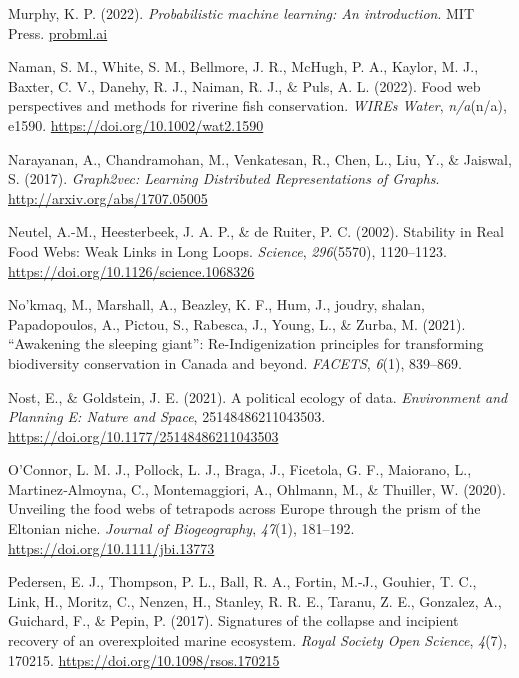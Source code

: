 \documentclass[11pt]{article}
\newlength{\cslhangindent}
\newenvironment{CSLReferences}[2] %
 {%
  \setlength{\parindent}{0pt}
  \ifodd #1 \everypar{\setlength{\hangindent}{\cslhangindent}}\ignorespaces\fi
  \ifnum #2 > 0
  \setlength{\parskip}{#2\baselineskip}
  \fi
 }%
 {}
\begin{document}
\begin{CSLReferences}{1}{0}
\leavevmode{}%
Murphy, K. P. (2022). \emph{Probabilistic machine learning: An
introduction}. MIT Press. \href{https://probml.ai}{probml.ai}

\leavevmode{}%
Naman, S. M., White, S. M., Bellmore, J. R., McHugh, P. A., Kaylor, M.
J., Baxter, C. V., Danehy, R. J., Naiman, R. J., \& Puls, A. L. (2022).
Food web perspectives and methods for riverine fish conservation.
\emph{WIREs Water}, \emph{n/a}(n/a), e1590.
\url{https://doi.org/10.1002/wat2.1590}

\leavevmode{}%
Narayanan, A., Chandramohan, M., Venkatesan, R., Chen, L., Liu, Y., \&
Jaiswal, S. (2017). \emph{Graph2vec: Learning Distributed
Representations of Graphs}. \url{http://arxiv.org/abs/1707.05005}

\leavevmode{}%
Neutel, A.-M., Heesterbeek, J. A. P., \& de Ruiter, P. C. (2002).
Stability in Real Food Webs: Weak Links in Long Loops. \emph{Science},
\emph{296}(5570), 1120--1123.
\url{https://doi.org/10.1126/science.1068326}

\leavevmode{}%
No'kmaq, M., Marshall, A., Beazley, K. F., Hum, J., joudry, shalan,
Papadopoulos, A., Pictou, S., Rabesca, J., Young, L., \& Zurba, M.
(2021). {``Awakening the sleeping giant''}: Re-Indigenization principles
for transforming biodiversity conservation in Canada and beyond.
\emph{FACETS}, \emph{6}(1), 839--869.

\leavevmode{}%
Nost, E., \& Goldstein, J. E. (2021). A political ecology of data.
\emph{Environment and Planning E: Nature and Space}, 25148486211043503.
\url{https://doi.org/10.1177/25148486211043503}

\leavevmode{}%
O'Connor, L. M. J., Pollock, L. J., Braga, J., Ficetola, G. F.,
Maiorano, L., Martinez‐Almoyna, C., Montemaggiori, A., Ohlmann, M., \&
Thuiller, W. (2020). Unveiling the food webs of tetrapods across Europe
through the prism of the Eltonian niche. \emph{Journal of Biogeography},
\emph{47}(1), 181--192. \url{https://doi.org/10.1111/jbi.13773}

\leavevmode{}%
Pedersen, E. J., Thompson, P. L., Ball, R. A., Fortin, M.-J., Gouhier,
T. C., Link, H., Moritz, C., Nenzen, H., Stanley, R. R. E., Taranu, Z.
E., Gonzalez, A., Guichard, F., \& Pepin, P. (2017). Signatures of the
collapse and incipient recovery of an overexploited marine ecosystem.
\emph{Royal Society Open Science}, \emph{4}(7), 170215.
\url{https://doi.org/10.1098/rsos.170215}


\end{CSLReferences}
\end{document}
